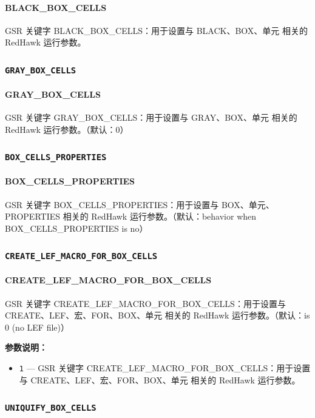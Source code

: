 \paragraph*{BLACK_BOX_CELLS}

GSR 关键字 BLACK_BOX_CELLS：用于设置与 BLACK、BOX、单元 相关的 RedHawk 运行参数。

\subsubsection{\texttt{GRAY_BOX_CELLS}}
\paragraph*{GRAY_BOX_CELLS}

GSR 关键字 GRAY_BOX_CELLS：用于设置与 GRAY、BOX、单元 相关的 RedHawk 运行参数。（默认：0）

\subsubsection{\texttt{BOX_CELLS_PROPERTIES}}
\paragraph*{BOX_CELLS_PROPERTIES}

GSR 关键字 BOX_CELLS_PROPERTIES：用于设置与 BOX、单元、PROPERTIES 相关的 RedHawk 运行参数。（默认：behavior when BOX_CELLS_PROPERTIES is no）

\subsubsection{\texttt{CREATE_LEF_MACRO_FOR_BOX_CELLS}}
\paragraph*{CREATE_LEF_MACRO_FOR_BOX_CELLS}

GSR 关键字 CREATE_LEF_MACRO_FOR_BOX_CELLS：用于设置与 CREATE、LEF、宏、FOR、BOX、单元 相关的 RedHawk 运行参数。（默认：is 0 (no LEF file)）

\textbf{参数说明：}
\begin{itemize}
\item \texttt{1} — GSR 关键字 CREATE\_LEF\_MACRO\_FOR\_BOX\_CELLS：用于设置与 CREATE、LEF、宏、FOR、BOX、单元 相关的 RedHawk 运行参数。
\end{itemize}

\subsubsection{\texttt{UNIQUIFY_BOX_CELLS}}
